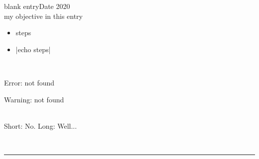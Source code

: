 \begin{entry}{blank entry}{Date 2020}
    \objective \\
    my objective in this entry

    \outline
    \begin{itemize}
        \item steps
    \end{itemize}
    \procedures
    \begin{itemize}
        \item {}|echo steps|
    \end{itemize}
    \observations\\
    \begin{error}{Error: not found}
    \end{error}
    \begin{warning}{Warning: not found}
    \end{warning}
    \results\\
    Short: No.
    Long: Well...
\end{entry}
\\\noindent\rule{\textwidth}{1pt}
